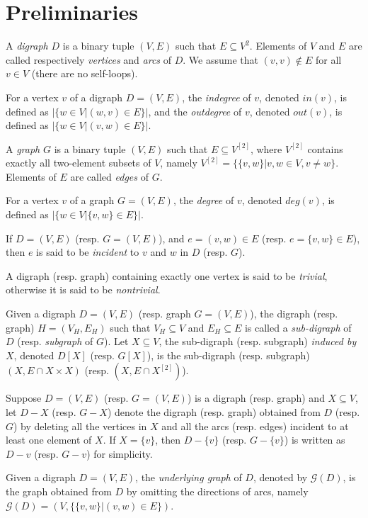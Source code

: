 \documentclass{article}
\begin{document}
\section{Preliminaries}\label{sec:prelim}


A \emph{digraph} $D$ is a binary tuple $(V, E)$ such that $E
\subseteq V^2$. Elements of $V$ and $E$ are called respectively
\emph{vertices} and \emph{arcs} of $D$. We assume that $(v,v) \not
\in E$ for all $v \in V$ (there are no self-loops).

For a vertex $v$ of a digraph $D=(V,E)$, the \emph{indegree} of $v$,
denoted $in(v)$, is defined as $\lvert\{w \in V | (w,v) \in
E\}\rvert$, and the \emph{outdegree} of $v$, denoted $out(v)$, is
defined as $|\{w \in V | (v,w) \in E\}|$.

A \emph{graph} $G$ is a binary tuple $(V, E)$ such that $E \subseteq
V^{[2]}$, where $V^{[2]}$ contains exactly all two-element subsets
of $V$, namely $V^{[2]}=\{\{v,w\}| v, w \in V, v \neq w\}$. Elements
of $E$ are called \emph{edges} of $G$.

For a vertex $v$ of a graph $G=(V,E)$, the \emph{degree} of $v$,
denoted $deg(v)$, is defined as $|\{w \in V | \{v,w\} \in E\}|$.

If $D=(V,E)$ (resp. $G=(V,E)$), and $e=(v,w) \in E$ (resp.
$e=\{v,w\} \in E$), then $e$ is said to be \emph{incident} to $v$
and $w$ in $D$ (resp. $G$).

A digraph (resp. graph) containing exactly one vertex is said to be
\emph{trivial}, otherwise it is said to be \emph{nontrivial}.


Given a digraph $D=(V,E)$ (resp. graph $G=(V,E)$), the digraph
(resp. graph) $H=(V_H,E_H)$ such that $V_H \subseteq V$ and $E_H
\subseteq E$ is called a \emph{sub-digraph} of $D$ (resp.
\emph{subgraph} of $G$). Let $X \subseteq V$, the sub-digraph (resp.
subgraph) \emph{induced by} $X$, denoted $D[X]$ (resp. $G[X]$), is
the sub-digraph (resp. subgraph) $(X,E \cap X \times X)$ (resp. $(X,
E \cap X^{[2]})$).



Suppose $D=(V,E)$ (resp. $G=(V,E)$) is a digraph (resp. graph) and
$X \subseteq V$, let $D-X$ (resp. $G-X$) denote the digraph (resp.
graph) obtained from $D$ (resp. $G$) by deleting all the vertices in
$X$ and all the arcs (resp. edges) incident to at least one element
of $X$. If $X=\{v\}$, then $D-\{v\}$ (resp. $G-\{v\}$) is written as
$D-v$ (resp. $G-v$) for simplicity.

Given a digraph $D=(V,E)$, the \emph{underlying graph} of $D$,
denoted by $\mathcal{G}(D)$, is the graph obtained from $D$ by
omitting the directions of arcs, namely $\mathcal{G}(D)=\left(V,
\{\{v,w\} | (v,w) \in E\}\right)$.
\end{document}
